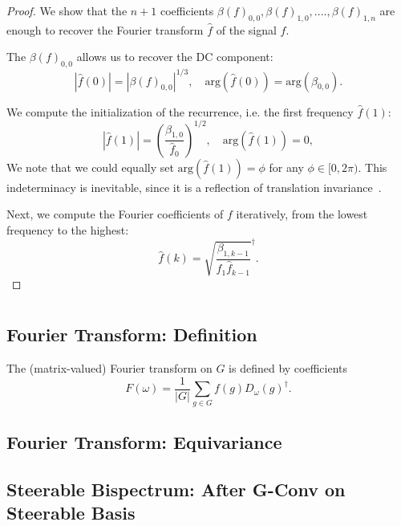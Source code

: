 \documentclass{article}
\begin{document}
\begin{proof}
    We show that the $n+1$ coefficients $\beta(f)_{0, 0}, \beta(f)_{1, 0}, ...., \beta(f)_{1, n}$ are enough to recover the Fourier transform $\hat f$ of the signal $f$.

    The $\beta(f)_{0, 0}$ allows us to recover the DC component:
    \begin{equation}
            |\hat f (0)| = |\beta(f)_{0, 0}|^{1/3}, \quad \text{arg}(\hat f(0)) = \text{arg}(\beta_{0, 0}).
    \end{equation}

   We compute the initialization of the recurrence, i.e. the first frequency $\hat f (1)$:
   \begin{equation}
       | \hat f (1)| = \left(\frac{\beta_{1, 0}}{ \hat{f}_{0} }\right)^{1/2}, \quad  \text{arg}(\hat f(1)) = 0,
   \end{equation}
   We note that we could equally set $\text{arg}(\hat f(1)) = \phi$ for any $\phi \in [0, 2\pi)$. This indeterminacy is inevitable, since it is a reflection of translation invariance~\cite{kondor2008thesis}.

    Next, we compute the Fourier coefficients of $f$ iteratively, from the lowest frequency to the highest:
       \begin{equation}
       \hat f (k) = \sqrt{\frac{\beta_{1, k-1}}{ \hat{f}_{1} \hat{f}_{k-1} }}^\dagger.
   \end{equation}
\end{proof}


\section{\color{deepblue}{Domain $\Omega = (G,~+)$ (finite groups)}}

\subsection{Fourier Transform: Definition}

The (matrix-valued) Fourier transform on $G$ is defined by coefficients
$$
F(\omega)=\frac{1}{|G|} \sum_{g \in G} f(g) D_\omega(g)^{\dagger} .
$$


\subsection{Fourier Transform: Equivariance}

\subsection{Steerable Bispectrum: After G-Conv on Steerable Basis}
\end{document}
